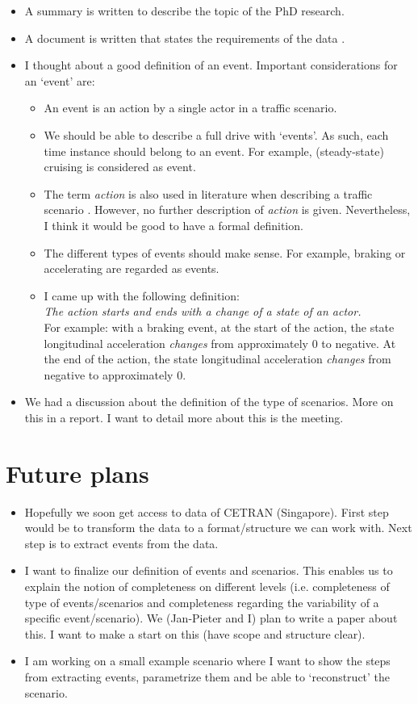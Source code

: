 \documentclass[10pt,final,a4paper,oneside,onecolumn]{article}
\begin{document}
\begin{itemize}
	\item A summary is written to describe the topic of the PhD research.
	\item A document is written that states the requirements of the data \cite{data_requirements}.
	\item I thought about a good definition of an event. Important considerations for an `event' are:
	\begin{itemize}
		\item An event is an action by a single actor in a traffic scenario.
		\item We should be able to describe a full drive with `events'. As such, each time instance should belong to an event. For example, (steady-state) cruising is considered as event.
		\item The term \emph{action} is also used in literature when describing a traffic scenario \cite{geyer2014,ulbrich2015}. However, no further description of \emph{action} is given. Nevertheless, I think it would be good to have a formal definition.
		\item The different types of events should make sense. For example, braking or accelerating are regarded as events.
		\item I came up with the following definition:\\
		\emph{The action starts and ends with a change of a state of an actor.} \\
		For example: with a braking event, at the start of the action, the state longitudinal acceleration \emph{changes} from approximately 0 to negative. At the end of the action, the state longitudinal acceleration \emph{changes} from negative to approximately 0.
	\end{itemize}
	\item We had a discussion about the definition of the type of scenarios. More on this in a report. I want to detail more about this is the meeting.
\end{itemize}

\section*{Future plans}
\begin{itemize}
	\item Hopefully we soon get access to data of CETRAN (Singapore). First step would be to transform the data to a format/structure we can work with. Next step is to extract events from the data.
	\item I want to finalize our definition of events and scenarios. This enables us to explain the notion of completeness on different levels (i.e. completeness of type of events/scenarios and completeness regarding the variability of a specific event/scenario). We (Jan-Pieter and I) plan to write a paper about this. I want to make a start on this (have scope and structure clear).
	\item I am working on a small example scenario where I want to show the steps from extracting events, parametrize them and be able to `reconstruct' the scenario.
\end{itemize}
\end{document}

